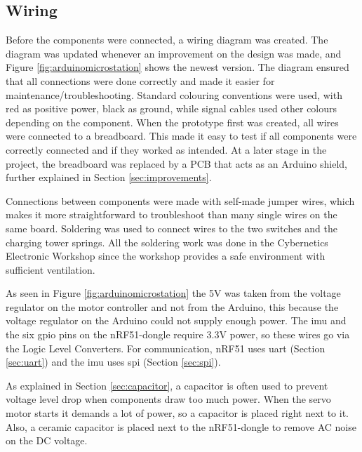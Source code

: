 \subsection{Wiring}
Before the components were connected, a wiring diagram was created. The diagram was updated whenever an improvement on the design was made, and Figure \ref{fig:arduinomicrostation} shows the newest version. The diagram ensured that all connections were done correctly and made it easier for maintenance/troubleshooting. Standard colouring conventions were used, with red as positive power, black as ground, while signal cables used other colours depending on the component. When the prototype first was created, all wires were connected to a breadboard. This made it easy to test if all components were correctly connected and if they worked as intended. At a later stage in the project, the breadboard was replaced by a PCB that acts as an Arduino shield, further explained in Section \ref{sec:improvements}.

Connections between components were made with self-made jumper wires, which makes it more straightforward to troubleshoot than many single wires on the same board. Soldering was used to connect wires to the two switches and the charging tower springs. All the soldering work was done in the Cybernetics Electronic Workshop since the workshop provides a safe environment with sufficient ventilation.

As seen in Figure \ref{fig:arduinomicrostation} the 5V was taken from the voltage regulator on the motor controller and not from the Arduino, this because the voltage regulator on the Arduino could not supply enough power. The \acrshort{imu} and the six \acrshort{gpio} pins on the nRF51-dongle require 3.3V power, so these wires go via the Logic Level Converters. For communication, nRF51 uses \acrshort{uart} (Section \ref{sec:uart}) and the \acrshort{imu} uses \acrshort{spi} (Section \ref{sec:spi}).

As explained in Section \ref{sec:capacitor}, a capacitor is often used to prevent voltage level drop when components draw too much power. When the servo motor starts it demands a lot of power, so a capacitor is placed right next to it. Also, a ceramic capacitor is placed next to the nRF51-dongle to remove AC noise on the DC voltage. 